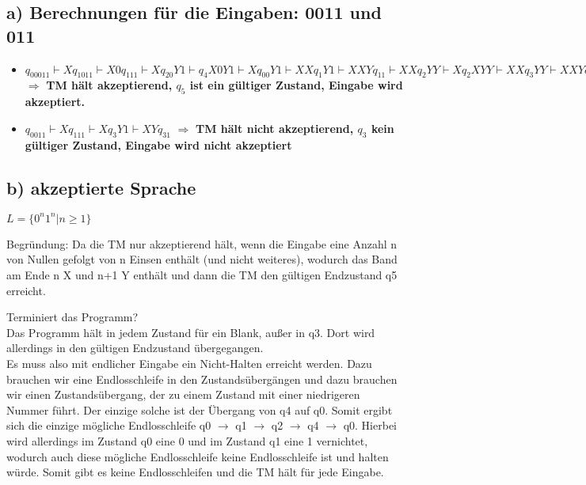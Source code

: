 \documentclass[11pt]{article}
\begin{document}
\subsection*{a) Berechnungen für die Eingaben: 0011 und 011}

\begin{itemize}
    \item $q_00011 \vdash Xq_1011 \vdash X0q_111 \vdash Xq_20Y1 
    \vdash q_4X0Y1 \vdash Xq_00Y1 \vdash XXq_1Y1 \vdash XXYq_11 \vdash XXq_2YY 
    \vdash Xq_2XYY \vdash XXq_3YY \vdash XXYq_3Y \vdash XXYYq_3 \vdash XXYYYq_5$
    \boldmath $\Longrightarrow$ \textbf{TM hält akzeptierend, $q_5$ ist ein gültiger Zustand, Eingabe wird akzeptiert.}

    \item \unboldmath $q_0011 \vdash Xq_111 \vdash Xq_3Y1 \vdash XYq_31$ \boldmath $\Longrightarrow$ \textbf{TM hält nicht akzeptierend, $q_3$ kein gültiger Zustand, Eingabe wird nicht akzeptiert}
\end{itemize}

\subsection*{b) akzeptierte Sprache}

$L = \{{0^n 1^n | n \geq 1}\} $

Begründung: Da die TM nur akzeptierend hält, wenn die Eingabe eine Anzahl n von Nullen gefolgt von n Einsen enthält (und nicht weiteres), wodurch das Band am Ende n X und n+1 Y enthält und dann die TM den gültigen Endzustand q5 erreicht.

Terminiert das Programm?\\
Das Programm hält in jedem Zustand für ein Blank, außer in q3. Dort wird allerdings in den gültigen Endzustand übergegangen.\\
Es muss also mit endlicher Eingabe ein Nicht-Halten erreicht werden. Dazu brauchen wir eine Endlosschleife in den Zustandsübergängen und dazu brauchen wir einen Zustandsübergang,
 der zu einem Zustand mit einer niedrigeren Nummer führt. Der einzige solche ist der Übergang von q4 auf q0. Somit ergibt sich die einzige mögliche Endlosschleife q0 $\rightarrow$ q1 
$\rightarrow$ q2 $\rightarrow$ q4 $\rightarrow$ q0. Hierbei wird allerdings im Zustand q0 eine 0 und im Zustand q1 eine 1 vernichtet, wodurch auch diese mögliche Endlosschleife keine Endlosschleife
ist und halten würde. Somit gibt es keine Endlosschleifen und die TM hält für jede Eingabe.
\end{document}
